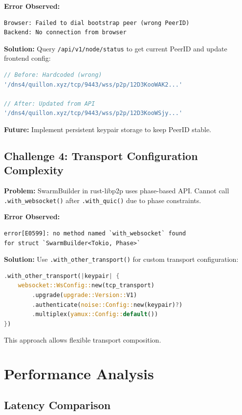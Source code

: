 \documentclass[11pt,a4paper]{article}
\begin{document}
\textbf{Error Observed:}
\begin{verbatim}
Browser: Failed to dial bootstrap peer (wrong PeerID)
Backend: No connection from browser
\end{verbatim}

\textbf{Solution:} Query \texttt{/api/v1/node/status} to get current PeerID and update frontend config:

\begin{lstlisting}[language=JavaScript]
// Before: Hardcoded (wrong)
'/dns4/quillon.xyz/tcp/9443/wss/p2p/12D3KooWAK2...'

// After: Updated from API
'/dns4/quillon.xyz/tcp/9443/wss/p2p/12D3KooWSjy...'
\end{lstlisting}

\textbf{Future:} Implement persistent keypair storage to keep PeerID stable.

\subsection{Challenge 4: Transport Configuration Complexity}

\textbf{Problem:} SwarmBuilder in rust-libp2p uses phase-based API. Cannot call \texttt{.with\_websocket()} after \texttt{.with\_quic()} due to phase constraints.

\textbf{Error Observed:}
\begin{verbatim}
error[E0599]: no method named `with_websocket` found
for struct `SwarmBuilder<Tokio, Phase>`
\end{verbatim}

\textbf{Solution:} Use \texttt{.with\_other\_transport()} for custom transport configuration:

\begin{lstlisting}[language=Rust]
.with_other_transport(|keypair| {
    websocket::WsConfig::new(tcp_transport)
        .upgrade(upgrade::Version::V1)
        .authenticate(noise::Config::new(keypair)?)
        .multiplex(yamux::Config::default())
})
\end{lstlisting}

This approach allows flexible transport composition.

\section{Performance Analysis}

\subsection{Latency Comparison}
\end{document}
